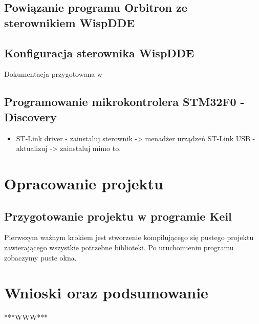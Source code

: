 \documentclass[12pt,a4paper]{article}
\begin{document}
		\subsection{Powiązanie programu Orbitron ze sterownikiem WispDDE}
		\subsection{Konfiguracja sterownika WispDDE}

	Dokumentacja przygotowana w \LaTeXe
		
	
		\subsection{Programowanie mikrokontrolera STM32F0 - Discovery}
		\begin{itemize}
			\item ST-Link driver - zainstaluj sterownik -> menadżer urządzeń ST-Link USB - aktualizuj -> zainstaluj mimo to.
		\end{itemize}

	

	\section{Opracowanie projektu}

		\subsection{Przygotowanie projektu w programie Keil}
		Pierwszym ważnym krokiem jest stworzenie kompilującego się pustego projektu zawierającego wszystkie potrzebne biblioteki. Po uruchomieniu programu zobaczymy puste okna.
	
	\section{Wnioski oraz podsumowanie}
	***WWW***
\end{document}
